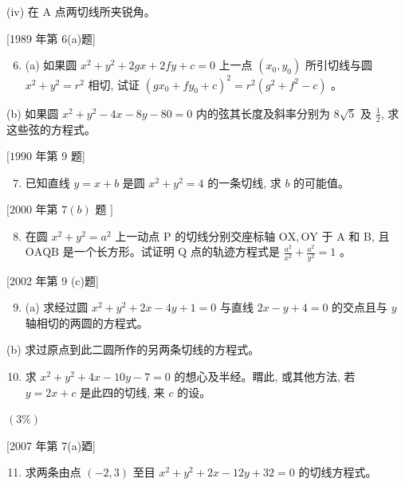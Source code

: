 \documentclass[10pt]{article}
\begin{document}
(iv) 在 $\mathrm{A}$ 点两切线所夹锐角。

[1989 年第 6(a)题]

\begin{enumerate}
  \setcounter{enumi}{5}
  \item (a) 如果圆 $x^{2}+y^{2}+2 g x+2 f y+c=0$ 上一点 $\left(x_{0}, y_{0}\right)$ 所引切线与圆 $x^{2}+y^{2}=r^{2}$ 相切, 试证 $\left(g x_{0}+f y_{0}+c\right)^{2}=r^{2}\left(g^{2}+f^{2}-c\right)$ 。
\end{enumerate}

(b) 如果圆 $x^{2}+y^{2}-4 x-8 y-80=0$ 内的弦其长度及斜率分别为 $8 \sqrt{5}$ 及 $\frac{1}{2}$, 求这些弦的方程式。

$[1990$ 年第 9 题]

\begin{enumerate}
  \setcounter{enumi}{6}
  \item 已知直线 $y=x+b$ 是圆 $x^{2}+y^{2}=4$ 的一条切线, 求 $b$ 的可能值。
\end{enumerate}

$[2000$ 年第 $7(b)$ 题 $]$

\begin{enumerate}
  \setcounter{enumi}{7}
  \item 在圆 $x^{2}+y^{2}=a^{2}$ 上一动点 $\mathrm{P}$ 的切线分别交座标轴 $\mathrm{OX}, \mathrm{OY}$ 于 $\mathrm{A}$ 和 $\mathrm{B}$, 且 $\mathrm{OAQB}$ 是一个长方形。试证明 $\mathrm{Q}$ 点的轨迹方程式是 $\frac{a^{2}}{x^{2}}+\frac{a^{2}}{y^{2}}=1$ 。
\end{enumerate}

[2002 年第 9 (c)题]

\begin{enumerate}
  \setcounter{enumi}{8}
  \item (a) 求经过圆 $x^{2}+y^{2}+2 x-4 y+1=0$ 与直线 $2 x-y+4=0$ 的交点且与 $y$ 轴相切的两圆的方程式。
\end{enumerate}

(b) 求过原点到此二圆所作的另两条切线的方程式。

\begin{enumerate}
  \setcounter{enumi}{9}
  \item 求 $x^{2}+y^{2}+4 x-10 y-7=0$ 的想心及半经。䁌此, 或其他方法, 若 $y=2 x+c$ 是此四的切线, 来 $c$ 的设。
\end{enumerate}

$(3 \%)$

[2007 年第 7(a)廼]

\begin{enumerate}
  \setcounter{enumi}{10}
  \item 求两条由点 $(-2,3)$ 至目 $x^{2}+y^{2}+2 x-12 y+32=0$ 的切线方程式。
\end{enumerate}
\end{document}
